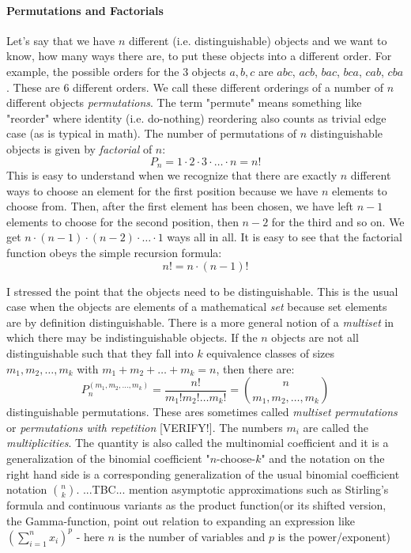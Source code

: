 \paragraph{Permutations and Factorials}
Let's say that we have $n$ different (i.e. distinguishable) objects and we want to know, how many ways there are, to put these objects into a different order. For example, the possible orders for the $3$ objects $a,b,c$ are $abc$, $acb$, $bac$, $bca$, $cab$, $cba$. These are $6$ different orders. We call these different orderings of a number of $n$ different objects \emph{permutations}. The term "permute" means something like "reorder" where identity (i.e. do-nothing) reordering also counts as trivial edge case (as is typical in math). The number of permutations of $n$ distinguishable objects is given by \emph{factorial} of $n$:
\begin{equation}
P_n = 1 \cdot 2 \cdot 3 \cdot \ldots \cdot n = n!
\end{equation}
This is easy to understand when we recognize that there are exactly $n$ different ways to choose an element for the first position because we have $n$ elements to choose from. Then, after the first element has been chosen, we have left $n-1$ elements to choose for the second position, then $n-2$ for the third and so on. We get $n\cdot(n-1)\cdot(n-2)\cdot\ldots\cdot1$ ways all in all. It is easy to see that the factorial function obeys the simple recursion formula:
\begin{equation}
n! = n \cdot (n-1)!
\end{equation}

\medskip
I stressed the point that the objects need to be distinguishable. This is the usual case when the objects are elements of a mathematical \emph{set} because set elements are by definition distinguishable. There is a more general notion of a \emph{multiset} in which there may be indistinguishable objects. If the $n$ objects are not all distinguishable such that they fall into $k$ equivalence classes of sizes $m_1, m_2, \ldots, m_k$ with $m_1 + m_2 + \ldots + m_k = n$, then there are:
\begin{equation}
P_n^{(m_1,m_2,\ldots,m_k)} 
= \frac{n!}{m_1! m_2! \ldots m_k!} 
= \binom{n}{m_1,m_2,\ldots, m_k}
\end{equation}
distinguishable permutations. These ares sometimes called \emph{multiset permutations} or \emph{permutations with repetition} [VERIFY!]. The numbers $m_i$ are called the \emph{multiplicities}. The quantity is also called the multinomial coefficient and it is a generalization of the binomial coefficient "$n$-choose-$k$" and the notation on the right hand side is a corresponding generalization of the usual binomial coefficient notation $\binom{n}{k}$. ...TBC... mention asymptotic approximations such as Stirling's formula and continuous variants as the product function(or its shifted version, the Gamma-function, point out relation to expanding an expression like $(\sum_{i=1}^{n} x_i)^p$ - here $n$ is the number of variables and $p$ is the power/exponent)


